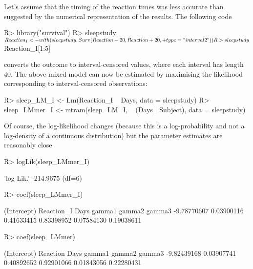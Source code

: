 \documentclass[article,nojss,shortnames]{jss}\usepackage[]{graphicx}\usepackage[]{xcolor}
\begin{document}
Let's assume that the timing of the reaction times was less accurate than suggested by the
numerical representation of the results. The following code
\begin{Schunk}
\begin{Sinput}
R> library("survival")
R> sleepstudy$Reaction_I <- with(sleepstudy, Surv(Reaction - 20, Reaction + 20, 
+                                                 type = "interval2"))
R> sleepstudy$Reaction_I[1:5]
\end{Sinput}
\begin{Soutput}
[1] [229.5600, 269.5600] [238.7047, 278.7047] [230.8006, 270.8006]
[4] [301.4398, 341.4398] [336.8519, 376.8519]
\end{Soutput}
\end{Schunk}
converts the outcome to interval-censored values, where each interval has
length $40$. The above mixed model can now be estimated by maximising the
likelihood corresponding to interval-censored observations:
\begin{Schunk}
\begin{Sinput}
R> sleep_LM_I <- Lm(Reaction_I ~ Days, data = sleepstudy)
R> sleep_LMmer_I <- mtram(sleep_LM_I, ~ (Days | Subject), data = sleepstudy)
\end{Sinput}
\end{Schunk}
Of course, the log-likelihood changes (because this is a log-probability and
not a log-density of a continuous distribution) but the parameter estimates are reasonably close
\begin{Schunk}
\begin{Sinput}
R> logLik(sleep_LMmer_I)
\end{Sinput}
\begin{Soutput}
'log Lik.' -214.9675 (df=6)
\end{Soutput}
\begin{Sinput}
R> coef(sleep_LMmer_I)
\end{Sinput}
\begin{Soutput}
(Intercept)  Reaction_I        Days      gamma1      gamma2      gamma3 
-9.78770607  0.03900116  0.41633415  0.83398952  0.07584130  0.19038611 
\end{Soutput}
\begin{Sinput}
R> coef(sleep_LMmer)
\end{Sinput}
\begin{Soutput}
(Intercept)    Reaction        Days      gamma1      gamma2      gamma3 
-9.82439168  0.03907741  0.40892652  0.92901066  0.01843056  0.22280431 
\end{Soutput}
\end{Schunk}
\end{document}
